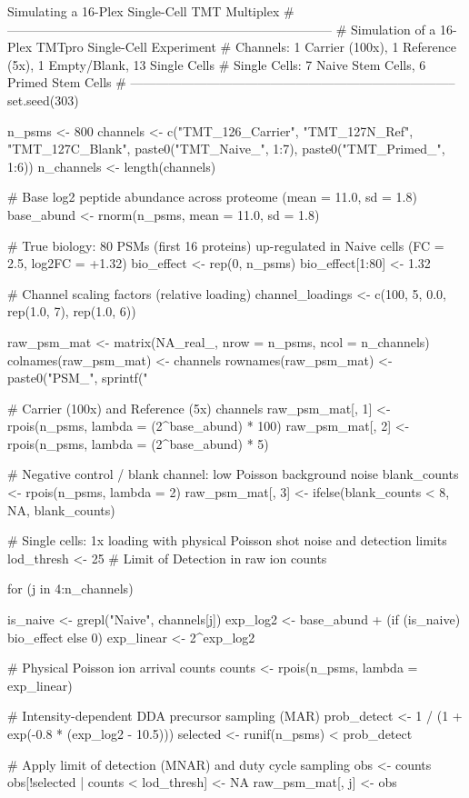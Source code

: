 \documentclass[11pt,twoside,openright]{book}
\begin{document}
\begin{rchunk}{Simulating a 16-Plex Single-Cell TMT Multiplex}
# -----------------------------------------------------------------------------
# Simulation of a 16-Plex TMTpro Single-Cell Experiment
# Channels: 1 Carrier (100x), 1 Reference (5x), 1 Empty/Blank, 13 Single Cells
# Single Cells: 7 Naive Stem Cells, 6 Primed Stem Cells
# -----------------------------------------------------------------------------
set.seed(303)

n_psms <- 800
channels <- c("TMT_126_Carrier", "TMT_127N_Ref", "TMT_127C_Blank",
              paste0("TMT_Naive_", 1:7), paste0("TMT_Primed_", 1:6))
n_channels <- length(channels)

# Base log2 peptide abundance across proteome (mean = 11.0, sd = 1.8)
base_abund <- rnorm(n_psms, mean = 11.0, sd = 1.8)

# True biology: 80 PSMs (first 16 proteins) up-regulated in Naive cells (FC = 2.5, log2FC = +1.32)
bio_effect <- rep(0, n_psms)
bio_effect[1:80] <- 1.32

# Channel scaling factors (relative loading)
channel_loadings <- c(100, 5, 0.0, rep(1.0, 7), rep(1.0, 6))

raw_psm_mat <- matrix(NA_real_, nrow = n_psms, ncol = n_channels)
colnames(raw_psm_mat) <- channels
rownames(raw_psm_mat) <- paste0("PSM_", sprintf("%

# Carrier (100x) and Reference (5x) channels
raw_psm_mat[, 1] <- rpois(n_psms, lambda = (2^base_abund) * 100)
raw_psm_mat[, 2] <- rpois(n_psms, lambda = (2^base_abund) * 5)

# Negative control / blank channel: low Poisson background noise
blank_counts <- rpois(n_psms, lambda = 2)
raw_psm_mat[, 3] <- ifelse(blank_counts < 8, NA, blank_counts)

# Single cells: 1x loading with physical Poisson shot noise and detection limits
lod_thresh <- 25  # Limit of Detection in raw ion counts

for (j in 4:n_channels) {
  is_naive <- grepl("Naive", channels[j])
  exp_log2 <- base_abund + (if (is_naive) bio_effect else 0)
  exp_linear <- 2^exp_log2
  
  # Physical Poisson ion arrival counts
  counts <- rpois(n_psms, lambda = exp_linear)
  
  # Intensity-dependent DDA precursor sampling (MAR)
  prob_detect <- 1 / (1 + exp(-0.8 * (exp_log2 - 10.5)))
  selected <- runif(n_psms) < prob_detect
  
  # Apply limit of detection (MNAR) and duty cycle sampling
  obs <- counts
  obs[!selected | counts < lod_thresh] <- NA
  raw_psm_mat[, j] <- obs
}


\end{rchunk}
\end{document}
